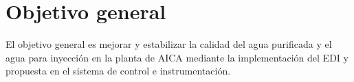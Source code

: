 \section*{Objetivo general}
El objetivo general es mejorar y estabilizar la calidad del 
agua purificada y el agua para inyección en la planta de AICA 
mediante la implementación del EDI y propuesta en el sistema de control e instrumentación.